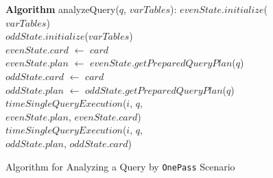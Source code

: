 \begin{figure}[t]
\begin{center}
\begin{algorithmic}
{\bf Algorithm} analyzeQuery($q$, $varTables$):
\STATE $evenState$.$initialize$($varTables$) \\
\STATE $oddState$.$initialize$($varTables$) \\
		\STATE $evenState$.$card$ $\leftarrow$ $card$ \\
    	\STATE $evenState$.$plan$ $\leftarrow$ $evenState$.$getPreparedQueryPlan$($q$) \\
    \ELSE
 	    \STATE $oddState$.$card$ $\leftarrow$ $card$ \\
	    \STATE $oddState$.$plan$ $\leftarrow$ $oddState$.$getPreparedQueryPlan$($q$) \\
    \ENDIF
				\STATE $timeSingleQueryExecution$($i$, $q$,  \\
						\hspace{14.0mm}$evenState$.$plan$, $evenState$.$card$) \\
			\ENDFOR
		\ENDIF
				\STATE $timeSingleQueryExecution$($i$, $q$,  \\
						\hspace{14.0mm}$oddState$.$plan$, $oddState$.$card$) \\	
			\ENDFOR
		\ENDIF
	\ENDIF
\ENDFOR 
\end{algorithmic}
\caption{Algorithm for Analyzing a Query by {\tt OnePass} Scenario\label{alg:onepass}}
\end{center}
\end{figure}
